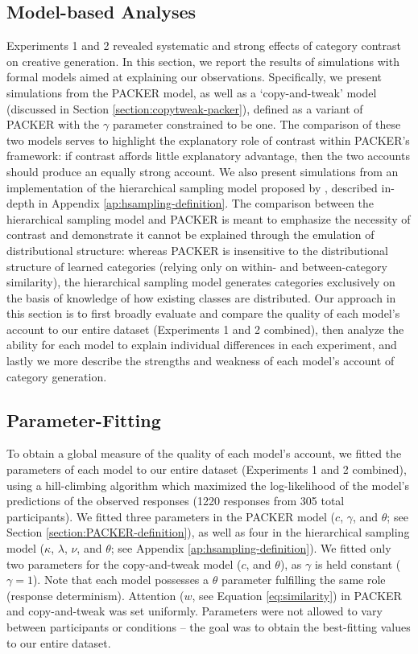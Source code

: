 \documentclass[12pt]{article}
\begin{document}
\begin{flushleft}
\section{Model-based Analyses}

Experiments 1 and 2 revealed systematic and strong effects of category contrast on creative generation. In this section, we report the results of simulations with formal models aimed at explaining our observations. Specifically, we present simulations from the PACKER model, as well as a `copy-and-tweak' model (discussed in Section \ref{section:copytweak-packer}), defined as a variant of PACKER with the $\gamma$ parameter constrained to be one. The comparison of these two models serves to highlight the explanatory role of contrast within PACKER's framework: if contrast affords little explanatory advantage, then the two accounts should produce an equally strong account. We also present simulations from an implementation of the hierarchical sampling model proposed by \cite{jern2013probabilistic}, described in-depth in Appendix \ref{ap:hsampling-definition}. The comparison between the hierarchical sampling model and PACKER is meant to emphasize the necessity of contrast and demonstrate it cannot be explained through the emulation of distributional structure: whereas PACKER is insensitive to the distributional structure of learned categories (relying only on within- and between-category similarity), the hierarchical sampling model generates categories exclusively on the basis of knowledge of how existing classes are distributed. Our approach in this section is to first broadly evaluate and compare the quality of each model's account to our entire dataset (Experiments 1 and 2 combined), then analyze the ability for each model to explain individual differences in each experiment, and lastly we more describe the strengths and weakness of each model's account of category generation.

\subsection{Parameter-Fitting}

To obtain a global measure of the quality of each model's account, we fitted the parameters of each model to our entire dataset (Experiments 1 and 2 combined), using a hill-climbing algorithm which maximized the log-likelihood of the model's predictions of the observed responses (1220 responses from 305 total participants). We fitted three parameters in the PACKER model ($c$, $\gamma$, and $\theta$; see Section \ref{section:PACKER-definition}), as well as four in the hierarchical sampling model ($\kappa$, $\lambda$, $\nu$, and $\theta$; see Appendix \ref{ap:hsampling-definition}). We fitted only two parameters for the copy-and-tweak model ($c$, and $\theta$), as $\gamma$ is held constant ($\gamma = 1$). Note that each model possesses a $\theta$ parameter fulfilling the same role (response determinism). Attention ($w$, see Equation \ref{eq:similarity}) in PACKER and copy-and-tweak was set uniformly. Parameters were not allowed to vary between participants or conditions -- the goal was to obtain the best-fitting values to our entire dataset.


\end{flushleft}
\end{document}

